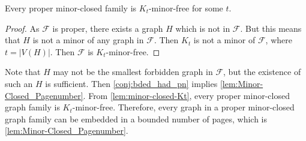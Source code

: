 \begin{lemma}\label{lem:minor-closed-Kt}
    Every proper minor-closed family is $K_t$-minor-free for some $t$. 
\end{lemma}
\begin{proof}
    As $\mathcal{F}$ is proper, there exists a graph $H$ which is not in $\mathcal{F}$. But this means that $H$ is not a minor of any graph in $\mathcal{F}$. Then $K_t$ is not a minor of $\mathcal{F}$, where $t = |V(H)|$. Then $\mathcal{F}$ is $K_t$-minor-free. 
\end{proof}
Note that $H$ may not be the smallest forbidden graph in $\mathcal{F}$, but the existence of such an $H$ is sufficient. 
Then \cref{conj:bded_had_pn} implies \cref{lem:Minor-Closed_Pagenumber}. From \cref{lem:minor-closed-Kt}, every proper minor-closed graph family is $K_t$-minor-free. Therefore, every graph in a proper minor-closed graph family can be embedded in a bounded number of pages, which is \cref{lem:Minor-Closed_Pagenumber}. 
